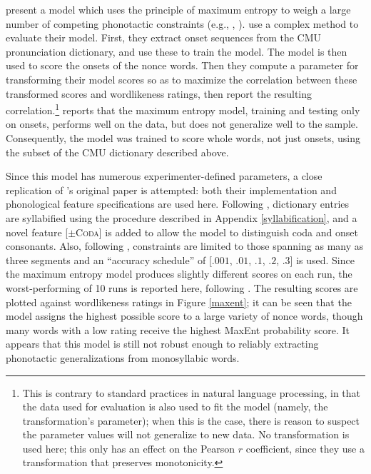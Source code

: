 \citet{Hayes2008a} present a model which uses the principle of maximum entropy to weigh a large number of competing phonotactic constraints (e.g., \citealt{Goldwater2003}, \citealt{Jager2007}). 
\citeauthor{Hayes2008a} use a complex method to evaluate their model. First, they extract onset sequences from the CMU pronunciation dictionary, and use these to train the model. 
The model is then used to score the onsets of the \citet{Scholes1966} nonce words. 
Then they compute a parameter for transforming their model scores so as to maximize the correlation between these transformed scores and wordlikeness ratings, then report the resulting correlation.\footnote{
    This is contrary to standard practices in natural language processing, in that the data used for evaluation is also used to fit the model (namely, the transformation's parameter); when this is the case, there is reason to suspect the parameter values will not generalize to new data.
    No transformation is used here; this only has an effect on the Pearson $r$ coefficient, since they use a transformation that preserves monotonicity.}
\citet{Albright2009a} reports that the maximum entropy model, training and testing only on onsets, performs well on the \citet{Scholes1966} data, but does not generalize well to the \citet{Albright2003b} sample.
Consequently, the model was trained to score whole words, not just onsets, using the subset of the CMU dictionary described above.

Since this model has numerous experimenter-defined parameters, a close replication of \citeauthor{Hayes2008a}'s original paper is attempted: both their implementation and phonological feature specifications are used here.
Following \citet{HayesInPress}, dictionary entries are syllabified using the procedure described in Appendix \ref{syllabification}, and a novel feature [$\pm$\textsc{Coda}] is added to allow the model to distinguish coda and onset consonants.
Also, following \citeauthor{Hayes2008a}, constraints are limited to those spanning as many as three segments and an ``accuracy schedule'' of [$.001$, $.01$, $.1$, $.2$, $.3$] is used.
Since the maximum entropy model produces slightly different scores on each run, the worst-performing of 10 runs is reported here, following \citeauthor{Hayes2008a}.
The resulting scores are plotted against wordlikeness ratings in Figure \ref{maxent}; it can be seen that the model assigns the highest possible score to a large variety of nonce words, though many words with a low rating receive the highest MaxEnt probability score.
It appears that this model is still not robust enough to reliably extracting phonotactic generalizations from monosyllabic words.

